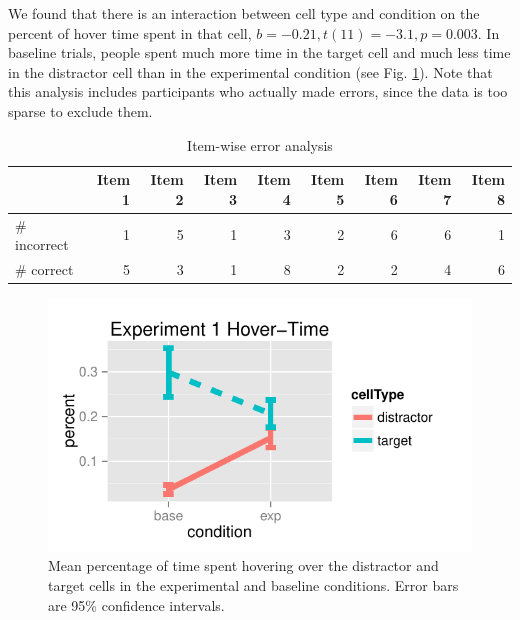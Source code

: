 \documentclass[10pt,letterpaper]{article}
\begin{document}
We found that there is an interaction between cell type and condition on the percent of hover time spent in that cell, $b = -0.21, t(11) = -3.1, p = 0.003$. In baseline trials, people spent much more time in the target cell and much less time in the distractor cell than in the experimental condition (see Fig. \ref{fig:exp1hover}). Note that this analysis includes participants who actually made errors, since the data is too sparse to exclude them. %

\begin{table}
\begin{center}
\begin{tabular}{ p{2cm} | r | r |  r | r | r | r | r | r |}
& Item 1 & Item 2 & Item 3 & Item 4 & Item 5 & Item 6 & Item 7 & Item 8\\\hline
\# incorrect & 1 & 5 & 1 & 3 & 2 &6 & 6 & 1 \\ 
\# correct & 5 & 3 & 1 & 8 & 2 & 2 & 4 & 6 \\
\end{tabular}
\caption{Item-wise error analysis}
\label{table:exp1ItemWise}
\end{center}
\end{table}

\begin{figure}[b!]
\begin{center}
\includegraphics[scale=.8]{images/exp1MouseTracking.pdf}
\caption{Mean percentage of time spent hovering over the distractor and target cells in the experimental and baseline conditions. Error bars are 95\% confidence intervals.}
\label{fig:exp1hover}
\end{center}
\end{figure}
\end{document}
